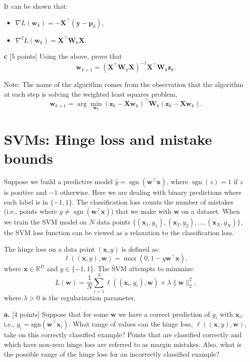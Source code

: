 \documentclass[a3paper,12pt]{extarticle} %
\begin{document}
It can be shown that:
\begin{itemize}
    \item \( \nabla L(\mathbf{w}_k) = -\mathbf{X}^\top (\mathbf{y} - \mathbf{p}_k) \),
    \item \( \nabla^2 L(\mathbf{w}_k) = \mathbf{X}^\top \mathbf{W}_k \mathbf{X} \).
\end{itemize}

\textbf{ c }[5 points] Using the above, prove that
\[
\mathbf{w}_{k+1} = (\mathbf{X}^\top \mathbf{W}_k \mathbf{X})^{-1} \mathbf{X}^\top \mathbf{W}_k \mathbf{z}_k.
\]

Note: The name of the algorithm comes from the observation that the algorithm at each step is solving the weighted least squares problem,
\[
\mathbf{w}_{k+1} = \arg\min_{\mathbf{w}_k} (\mathbf{z}_k - \mathbf{X} \mathbf{w}_k)^\top \mathbf{W}_k (\mathbf{z}_k - \mathbf{X} \mathbf{w}_k).
\]
\newpage

\section{SVMs: Hinge loss and mistake bounds}
Suppose we build a predictive model $\hat{y} = \operatorname{sgn}(\mathbf{w}^\top \mathbf{x})$, where $\operatorname{sgn}(z) = 1$ if $z$ is positive and $-1$ otherwise. Here we are dealing with binary predictions where each label is in $\{-1, 1\}$. The classification loss counts the number of mistakes (i.e., points where $y \neq \operatorname{sgn}(\mathbf{w}^\top \mathbf{x})$) that we make with $\mathbf{w}$ on a dataset. When we train the SVM model on $N$ data points $\{(\mathbf{x}_1, y_1), (\mathbf{x}_2, y_2), \ldots, (\mathbf{x}_N, y_N)\}$, the SVM loss function can be viewed as a relaxation to the classification loss.

The hinge loss on a data point $(\mathbf{x}, y)$ is defined as:
\[
\ell((\mathbf{x}, y), \mathbf{w}) = \max(0, 1 - y \mathbf{w}^\top \mathbf{x}),
\]
where $\mathbf{x} \in \mathbb{R}^D$ and $y \in \{-1, 1\}$. The SVM attempts to minimize:
\[
L(\mathbf{w}) = \frac{1}{N} \sum_{i=1}^N \ell((\mathbf{x}_i, y_i), \mathbf{w}) + \lambda \|\mathbf{w}\|_2^2,
\]
where $\lambda > 0$ is the regularization parameter.

\noindent \textbf{a.} [4 points] Suppose that for some \( \mathbf{w} \) we have a correct prediction of \( y_i \) with \( \mathbf{x}_i \), i.e., \( y_i = \text{sgn}(\mathbf{w}^\top \mathbf{x}_i) \). What range of values can the hinge loss, \( \ell((\mathbf{x}, y), \mathbf{w}) \), take on this correctly classified example? Points that are classified correctly and which have non-zero hinge loss are referred to as margin mistakes. Also, what is the possible range of the hinge loss for an incorrectly classified example?
\end{document}
